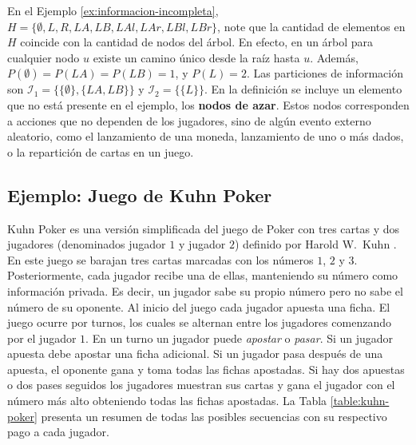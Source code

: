 En el Ejemplo \ref{ex:informacion-incompleta}, $H = \{ \emptyset, L, R, LA, LB, LAl, LAr, LBl, LBr\}$, note que la cantidad de elementos en $H$ coincide con la cantidad de nodos del árbol. En efecto, en un árbol para cualquier nodo $u$ existe un camino único desde la raíz hasta $u$. Además, $P(\emptyset) = P(LA) = P(LB) = 1$, y $P(L) = 2$. Las particiones de información son $\mathcal{I}_1 = \{\{\emptyset\}, \{LA, LB\}\}$ y $\mathcal{I}_2  = \{\{L\}\}$. En la definición se incluye un elemento que no está presente en el ejemplo, los \textbf{nodos de azar}. Estos nodos corresponden a acciones que no dependen de los jugadores, sino de algún evento externo aleatorio, como el lanzamiento de una moneda, lanzamiento de uno o más dados, o la repartición de cartas en un juego.

\subsection*{Ejemplo: Juego de Kuhn Poker}
\label{section:kuhn-poker}

Kuhn Poker es una versión simplificada del juego de Poker con tres cartas y dos jugadores (denominados jugador $1$ y jugador $2$) definido por Harold W.\ Kuhn \cite{bib:kuhn-poker}. En este juego se barajan tres cartas marcadas con los números $1$, $2$ y $3$. Posteriormente, cada jugador recibe una de ellas, manteniendo su número como información privada. Es decir, un jugador sabe su propio número pero no sabe el número de su oponente. Al inicio del juego cada jugador apuesta una ficha. El juego ocurre por turnos, los cuales se alternan entre los jugadores comenzando por el jugador $1$. En un turno un jugador puede \textit{apostar} o \textit{pasar}. Si un jugador apuesta debe apostar una ficha adicional. Si un jugador pasa después de una apuesta, el oponente gana y toma todas las fichas apostadas. Si hay dos apuestas o dos pases seguidos los jugadores muestran sus cartas y gana el jugador con el número más alto obteniendo todas las fichas apostadas. La Tabla \ref{table:kuhn-poker} presenta un resumen de todas las posibles secuencias con su respectivo pago a cada jugador.

